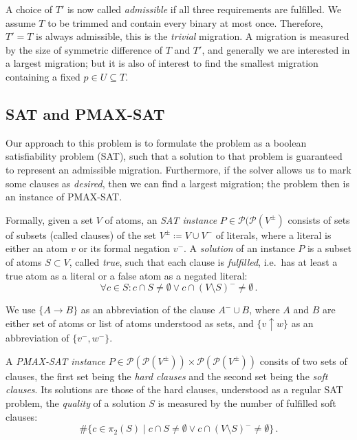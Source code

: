\documentclass[halfparskip,11pt]{scrartcl}
\begin{document}

A choice of $T'$ is now called \emph{admissible} if all three requirements are fulfilled. We assume $T$ to be trimmed and contain every binary at most once. Therefore, $T'=T$ is always admissible, this is the \emph{trivial} migration. A migration is measured by the size of symmetric difference of $T$ and $T'$, and generally we are interested in a largest migration; but it is also of interest to find the smallest migration containing a fixed $p\in U\subseteq T$.

\subsection{SAT and PMAX-SAT}
\label{sec:sat}

Our approach to this problem is to formulate the problem as a boolean satisfiability problem (SAT), such that a solution to that problem is guaranteed to represent an admissible migration. Furthermore, if the solver allows us to mark some clauses as \emph{desired}, then we can find a largest migration; the problem then is an instance of PMAX-SAT.

Formally, given a set $V$ of atoms, an \emph{SAT instance} $P\in \mathcal P(\mathcal P(V^\pm)$ consists of sets of subsets (called clauses) of the set $V^\pm \coloneqq V \cup V^-$ of literals, where a literal is either an atom $v$ or its formal negation $v^-$. A \emph{solution} of an instance $P$ is a subset of atoms $S\subset V$, called \emph{true}, such that each clause is \emph{fulfilled}, i.e.\ has at least a true atom as a literal or a false atom as a negated literal:
\[
\forall c\in S\colon c\cap S \ne \emptyset \vee c \cap (V\setminus S)^- \ne \emptyset\,.
\]

We use $\{A \to B\}$ as an abbreviation of the clause $A^- \cup B$, where $A$ and $B$ are either set of atoms or list of atoms understood as sets, and $\{v\uparrow w\}$ as an abbreviation of $\{v^-,w^-\}$.

A \emph{PMAX-SAT instance} $P\in \mathcal P(\mathcal P(V^\pm))\times \mathcal P(\mathcal P(V^\pm))$ consits of two sets of clauses, the first set being the \emph{hard clauses} and the second set being the \emph{soft clauses}. Its solutions are those of the hard clauses, understood as a regular SAT problem, the \emph{quality} of a solution $S$ is measured by the number of fulfilled soft clauses:
\[
\#\{c\in \pi_2(S) \mid c\cap S \ne \emptyset \vee c \cap (V\setminus S)^- \ne \emptyset\}\,.
\]
\end{document}
